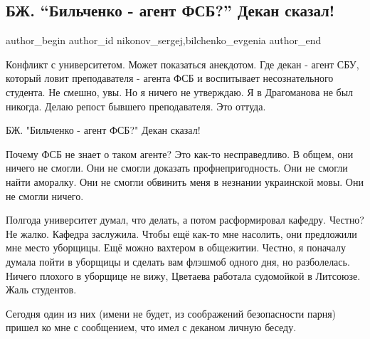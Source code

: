  
 
 
 
 
 
\subsection{БЖ. \enquote{Бильченко - агент ФСБ?} Декан сказал!}
\label{sec:09_09_2021.fb.nikonov_sergej.3.bilchenko_dekan_agent_fsb}
 
\ifcmt
 author_begin
   author_id nikonov_sergej,bilchenko_evgenia
 author_end
\fi

Конфликт с университетом. Может показаться анекдотом. Где декан - агент СБУ,
который ловит преподавателя - агента ФСБ и воспитывает несознательного
студента. Не смешно, увы. Но я ничего не утверждаю. Я в Драгоманова не был
никогда. Делаю репост бывшего преподавателя.  Это оттуда.


БЖ. "Бильченко - агент ФСБ?" Декан сказал!

Почему ФСБ не знает о таком агенте? Это как-то несправедливо. В общем, они
ничего не смогли. Они не смогли доказать профнепригодность. Они не смогли найти
аморалку. Они не смогли обвинить меня в незнании украинской мовы. Они не смогли
ничего.

Полгода университет думал, что делать, а потом расформировал кафедру. Честно?
Не жалко. Кафедра заслужила. Чтобы ещё как-то мне насолить, они предложили мне
место уборщицы. Ещё можно вахтером в общежитии. Честно, я поначалу думала пойти
в уборщицы и сделать вам флэшмоб одного дня, но разболелась. Ничего плохого в
уборщице не вижу, Цветаева работала судомойкой в Литсоюзе. Жаль студентов.

Сегодня один из них (имени не будет, из соображений безопасности парня) пришел
ко мне с сообщением, что имел с деканом личную беседу.

